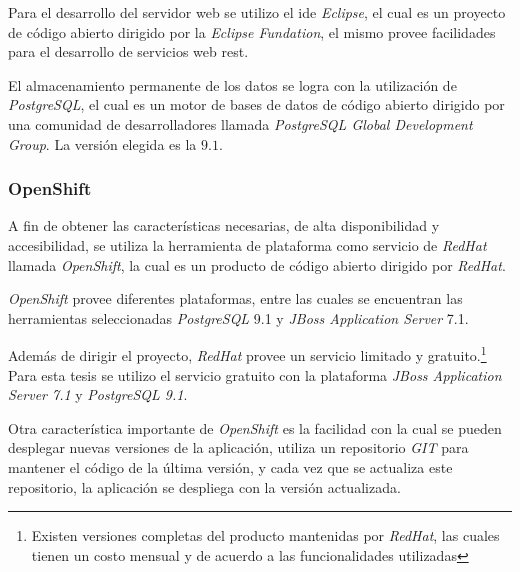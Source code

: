 Para el desarrollo del servidor web se utilizo el \Gls{ide} \textit{Eclipse}, el
cual es un proyecto de código abierto dirigido por la \textit{Eclipse
    Fundation}\cite{eclipse}, el mismo provee facilidades para el desarrollo de
servicios web \Gls{rest}.

El almacenamiento permanente de los datos se logra con la utilización de
\textit{PostgreSQL}, el cual es un motor de bases de datos de código abierto
dirigido por una comunidad de desarrolladores llamada \textit{PostgreSQL Global
    Development Group}. La versión elegida es la $9.1$.

\subsubsection{OpenShift}

A fin de obtener las características necesarias, de alta disponibilidad y
accesibilidad, se utiliza la herramienta de plataforma como servicio de
\textit{RedHat} llamada \textit{OpenShift}, la cual es un producto de código
abierto dirigido por \textit{RedHat}.

\textit{OpenShift} provee diferentes plataformas, entre las cuales se encuentran
las herramientas seleccionadas \textit{PostgreSQL} 9.1 y \textit{JBoss
    Application Server} 7.1.

Además de dirigir el proyecto, \textit{RedHat} provee un servicio limitado y
gratuito\cite{openshift:pricing}.\footnote{Existen versiones completas del
    producto mantenidas por \textit{RedHat}, las cuales tienen un costo mensual
    y de acuerdo a las funcionalidades utilizadas\cite{openshift:pricing}} Para
esta tesis se utilizo el servicio gratuito con la plataforma \textit{JBoss
    Application Server 7.1} y \textit{PostgreSQL 9.1}.

Otra característica importante de \textit{OpenShift} es la facilidad con la cual
se pueden desplegar nuevas versiones de la aplicación, utiliza un repositorio
\textit{GIT} para mantener el código de la última versión, y cada vez que se
actualiza este repositorio, la aplicación se despliega con la versión
actualizada.


